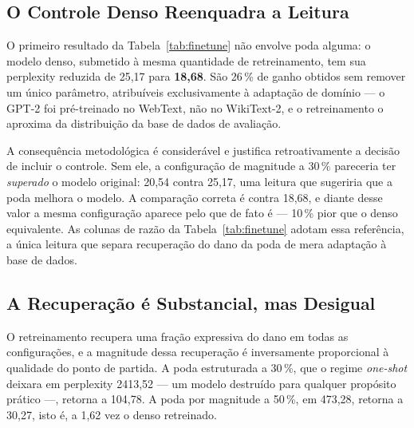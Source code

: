 \begin{table}[htb]
\centering
\caption{Perplexity antes (\textit{one-shot}) e depois do \textit{fine-tuning} de
recuperação (uma época, 297 passos). Sem análise de sensibilidade, a alocação é a uniforme
na poda por magnitude e a global na estruturada; com análise de sensibilidade, usa-se
$\beta = 1{,}0$, o expoente de intensidade da Equação~\ref{eq:alocacao_dev} com o qual a
alocação segue integralmente o perfil de sensibilidade. A razão expressa a perplexity
pós-retreinamento como múltiplo da do modelo denso retreinado, e não do modelo denso
original.}
\label{tab:finetune}
\small

\end{table}

\subsection{O Controle Denso Reenquadra a Leitura}\label{subsec:controle_denso}

O primeiro resultado da Tabela~\ref{tab:finetune} não envolve poda alguma: o
modelo denso, submetido à mesma quantidade de retreinamento, tem sua perplexity
reduzida de 25,17 para \textbf{18,68}. São 26\,\% de ganho obtidos sem
remover um único parâmetro, atribuíveis exclusivamente à adaptação de domínio
--- o GPT-2 foi pré-treinado no WebText, não no WikiText-2, e o retreinamento
o aproxima da distribuição da base de dados de avaliação.

A consequência metodológica é considerável e justifica retroativamente a
decisão de incluir o controle. Sem ele, a configuração de magnitude a
30\,\% pareceria ter \textit{superado} o modelo original: 20,54 contra 25,17,
uma leitura que sugeriria que a poda melhora o modelo. A comparação correta é
contra 18,68, e diante desse valor a mesma configuração aparece pelo que de
fato é --- 10\,\% pior que o denso equivalente. As colunas de razão da
Tabela~\ref{tab:finetune} adotam essa referência, a única leitura que
separa recuperação do dano da poda de mera adaptação à base de dados.

\subsection{A Recuperação é Substancial, mas Desigual}\label{subsec:recuperacao}

O retreinamento recupera uma fração expressiva do dano em todas as
configurações, e a magnitude dessa recuperação é inversamente proporcional à
qualidade do ponto de partida. A poda estruturada a 30\,\%, que o regime
\textit{one-shot} deixara em perplexity 2413,52 --- um modelo destruído para
qualquer propósito prático ---, retorna a 104,78. A poda por magnitude a
50\,\%, em 473,28, retorna a 30,27, isto é, a 1,62 vez o denso retreinado.

